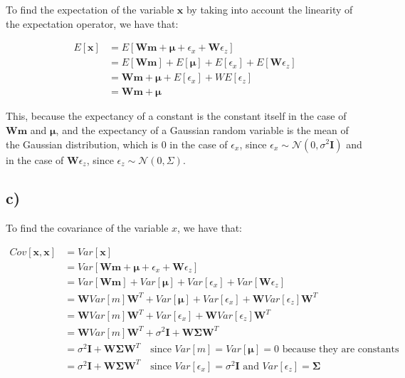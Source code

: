 \documentclass[12pt,a4paper,oneside]{paper}
\begin{document}
To find the expectation of the variable $\bm{x}$ by taking into account the linearity of the expectation operator, we have that:

\begin{align*}
    E[\bm{x}] &= E[\bm{W}\bm{m} + \bm{\mu} + \epsilon_x + \bm{W}\epsilon_z] \\
    &= E[\bm{W}\bm{m}] + E[\bm{\mu}] + E[\epsilon_x] + E[\bm{W}\epsilon_z] \\
    &= \bm{W}\bm{m} + \bm{\mu} + E[\epsilon_x] + W E[\epsilon_z] \\
    &= \bm{W}\bm{m} + \bm{\mu}
\end{align*}

This, because the expectancy of a constant is the constant itself in the case of $\bm{W}\bm{m}$ and $\bm{\mu}$, and the expectancy of a Gaussian random variable is the mean of the Gaussian distribution,
which is 0 in the case of $\epsilon_x$, since $\epsilon_x \sim \mathcal{N}(0, \sigma^2 \bm{I})$ and in the case of $\bm{W}\epsilon_z$, since $\epsilon_z \sim \mathcal{N}(0, \Sigma)$.

\subsection*{c)}

To find the covariance of the variable $x$, we have that:

\begin{align*}
    Cov[\bm{x}, \bm{x}] &= Var[\bm{x}] \\
    &= Var[\bm{W}\bm{m} + \bm{\mu} + \epsilon_x + \bm{W}\epsilon_z] \\
    &= Var[\bm{W}\bm{m}] + Var[\bm{\mu}] + Var[\epsilon_x] + Var[\bm{W}\epsilon_z] \\
    &= \bm{W} Var[m] \bm{W}^T + Var[\bm{\mu}] + Var[\epsilon_x] + \bm{W} Var[\epsilon_z] \bm{W}^T \\
    &= \bm{W} Var[m] \bm{W}^T + Var[\epsilon_x] + \bm{W} Var[\epsilon_z] \bm{W}^T \\
    &= \bm{W} Var[m] \bm{W}^T + \sigma^2 \bm{I} + \bm{W} \bm{\Sigma} \bm{W}^T \\
    &= \sigma^2 \bm{I} + \bm{W} \bm{\Sigma} \bm{W}^T \quad \text{since $Var[m] = Var[\bm{\mu}] = 0$ because they are constants} \\
    &= \sigma^2 \bm{I} + \bm{W} \bm{\Sigma} \bm{W}^T \quad \text{since $Var[\epsilon_x] = \sigma^2 \bm{I}$ and $Var[\epsilon_z] = \bm{\Sigma}$}
\end{align*}
\end{document}
